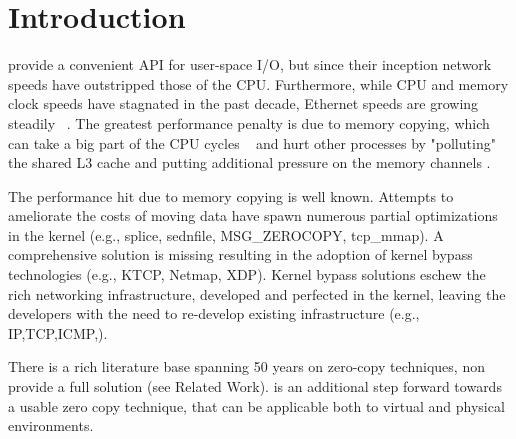 \section{Introduction}
\sockets provide a convenient API for user-space I/O, but since their inception network speeds have outstripped those of the CPU. Furthermore, while CPU and memory clock speeds have stagnated in the past decade, Ethernet speeds are growing steadily ~\cite{roadmap}. The greatest performance penalty is due to memory copying, which can take a big part of the CPU cycles ~\cite{desendmsg} and hurt other processes by "polluting" the shared L3 cache and putting additional pressure on the memory channels \cite{markuze2016true}. 

The performance hit due to memory copying is well known. Attempts to ameliorate the costs of moving data have spawn numerous partial optimizations in the kernel (e.g., splice, sednfile, MSG\_ZEROCOPY, tcp\_mmap). A comprehensive solution is missing resulting in the adoption of kernel bypass technologies (e.g., KTCP, Netmap, XDP). Kernel bypass solutions eschew the rich networking infrastructure, developed and perfected in the kernel, leaving the developers with the need to re-develop existing infrastructure (e.g., IP,TCP,ICMP,).

There is a rich literature base spanning 50 years on zero-copy techniques, non provide a full solution (see Related Work). \oursys is an additional step forward towards a usable zero copy technique, that can be applicable both to virtual and physical environments.